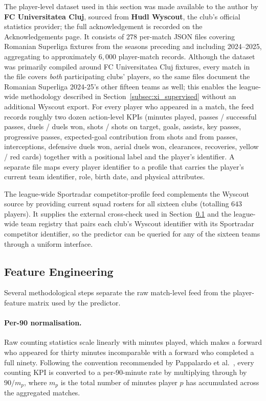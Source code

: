 The player-level dataset used in this section was made available to the author by \textbf{FC Universitatea Cluj}, sourced from \textbf{Hudl Wyscout}, the club's official statistics provider; the full acknowledgement is recorded on the Acknowledgements page. It consists of $278$ per-match JSON files covering Romanian Superliga fixtures from the seasons preceding and including 2024--2025, aggregating to approximately $6{,}000$ player-match records. Although the dataset was primarily compiled around FC Universitatea Cluj fixtures, every match in the file covers \emph{both} participating clubs' players, so the same files document the Romanian Superliga 2024-25's other fifteen teams as well; this enables the league-wide methodology described in Section~\ref{subsec:xi_supervised} without an additional Wyscout export. For every player who appeared in a match, the feed records roughly two dozen action-level KPIs (minutes played, passes / successful passes, duels / duels won, shots / shots on target, goals, assists, key passes, progressive passes, expected-goal contribution from shots and from passes, interceptions, defensive duels won, aerial duels won, clearances, recoveries, yellow / red cards) together with a positional label and the player's identifier. A separate file maps every player identifier to a profile that carries the player's current team identifier, role, birth date, and physical attributes.

The league-wide Sportradar competitor-profile feed complements the Wyscout source by providing current squad rosters for all sixteen clubs (totalling $643$ players). It supplies the external cross-check used in Section~\ref{subsec:xi_features} and the league-wide team registry that pairs each club's Wyscout identifier with its Sportradar competitor identifier, so the predictor can be queried for any of the sixteen teams through a uniform interface.

\subsection{Feature Engineering}
\label{subsec:xi_features}

Several methodological steps separate the raw match-level feed from the player-feature matrix used by the predictor.

\paragraph{Per-90 normalisation.}
Raw counting statistics scale linearly with minutes played, which makes a forward who appeared for thirty minutes incomparable with a forward who completed a full ninety. Following the convention recommended by Pappalardo et al.~\cite{pappalardo2019playerank}, every counting KPI is converted to a per-90-minute rate by multiplying through by $90 / m_p$, where $m_p$ is the total number of minutes player $p$ has accumulated across the aggregated matches.

